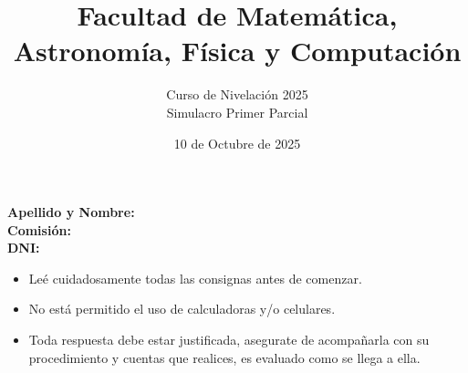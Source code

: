 \documentclass[a4paper]{article}
\title{Facultad de Matemática, Astronomía, Física y Computación}
\author{Curso de Nivelación 2025\\Simulacro Primer Parcial}
\date{10 de Octubre de 2025}
\begin{document}
\maketitle
\noindent\textbf{Apellido y Nombre:}\\
\textbf{Comisión:}\\
\textbf{DNI:}
\begin{itemize}
        \item Leé cuidadosamente todas las consignas antes de comenzar.
        \item No está permitido el uso de calculadoras y/o celulares.
        \item Toda respuesta debe estar justificada, asegurate de acompañarla con su procedimiento y cuentas que realices, es evaluado como se llega a ella.
\end{itemize}
\end{document}
